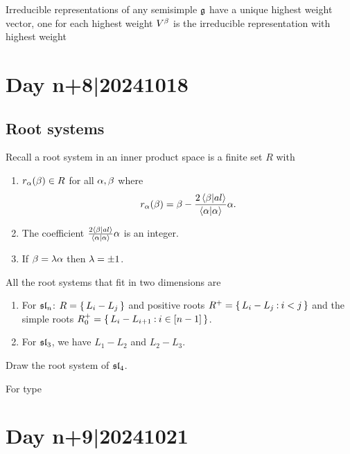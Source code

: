 \documentclass[12pt]{memoir}
\begin{document}
\begin{Prop}
    Irreducible representations of any semisimple $\mathfrak{g}$ have a unique highest weight vector, one for each highest weight $V^\beta$ is the irreducible representation with highest weight 
\end{Prop}

\section{Day n+8|20241018}

\subsection{Root systems}

Recall a root system in an inner product space is a finite set $R$ with 

\begin{enumerate}
    \item $r_\alpha(\beta)\in R$ for all $\alpha,\beta$ where
    $$r_\alpha(\beta)=\beta-\frac{2\braket{\beta}{al}}{\braket{\alpha}{\alpha}}\alpha.$$
    \item The coefficient $\frac{2\braket{\beta}{al}}{\braket{\alpha}{\alpha}}\alpha$ is an integer.
    \item If $\beta=\lambda\alpha$ then $\lambda=\pm1$.
\end{enumerate}

\begin{Ex}
    All the root systems that fit in two dimensions are
    \begin{enumerate}
        \item For $\mathfrak{sl}_n$: $R=\{\,L_i-L_j\,\}$ and positive roots $R^+=\{\,L_i-L_j\mathbin{:} i<j\,\}$ and the simple roots $R^+_0=\{\,L_i-L_{i+1}\mathbin{:} i\in\left\lbrack n-1\right\rbrack\,\}$.
        \item For $\mathfrak{sl}_3$, we have $L_1-L_2$ and $L_2-L_3$.
    \end{enumerate}
\end{Ex}

\begin{Ej}
    Draw the root system of $\mathfrak{sl}_4$.
\end{Ej}

\begin{Ex}
    For type 
\end{Ex}

\section{Day n+9|20241021}
\end{document}

